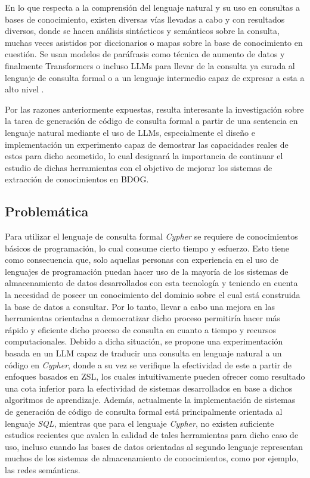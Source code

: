 En lo que respecta a la comprensión del lenguaje natural y su uso en consultas a bases de conocimiento, existen diversas vías llevadas a cabo y con resultados diversos, donde se hacen análisis sintácticos y semánticos sobre la consulta, muchas veces asistidos por diccionarios o mapas sobre la base de conocimiento en cuestión. Se usan modelos de paráfrasis como técnica de aumento de datos y finalmente Transformers \cite{transformers} o incluso LLMs para llevar de la consulta ya curada al lenguaje de consulta formal o a un lenguaje intermedio capaz de expresar a esta a alto nivel \cite{text2sql1} \cite{text2sql2} \cite{text2cypher1} \cite{text2cypher2}.

Por las razones anteriormente expuestas, resulta interesante la investigación sobre la tarea de generación de código de consulta formal a partir de una sentencia en lenguaje natural mediante el uso de LLMs, especialmente el diseño e implementación un experimento capaz de demostrar las capacidades reales de estos para dicho acometido, lo cual designará la importancia de continuar el estudio de dichas herramientas con el objetivo de mejorar los sistemas de extracción de conocimientos en BDOG.

\subsection*{Problemática}
Para utilizar el lenguaje de consulta formal \textit{Cypher} se requiere de conocimientos básicos de programación, lo cual consume cierto tiempo y esfuerzo. Esto tiene como consecuencia que, solo aquellas personas con experiencia en el uso de lenguajes de programación puedan hacer uso de la mayoría de los sistemas de almacenamiento de datos desarrollados con esta tecnología y teniendo en cuenta la necesidad de poseer un conocimiento del dominio sobre el cual está construida la base de datos a consultar. Por lo tanto, llevar a cabo una mejora en las herramientas orientadas a democratizar dicho proceso permitiría hacer más rápido y eficiente dicho proceso de consulta en cuanto a tiempo y recursos computacionales. Debido a dicha situación, se propone una experimentación basada en un LLM capaz de traducir una consulta en lenguaje natural a un código en \textit{Cypher}, donde a su vez se verifique la efectividad de este a partir de enfoques basados en ZSL, los cuales intuitivamente pueden ofrecer como resultado una cota inferior para la efectividad de sistemas desarrollados en base a dichos algoritmos de aprendizaje. Además, actualmente la implementación de sistemas de generación de código de consulta formal está principalmente orientada al lenguaje \textit{SQL}, mientras que para el lenguaje \textit{Cypher}, no existen suficiente estudios recientes que avalen la calidad de tales herramientas para dicho caso de uso, incluso cuando las bases de datos orientadas al segundo lenguaje representan muchos de los sistemas de almacenamiento de conocimientos, como por ejemplo, las redes semánticas.

